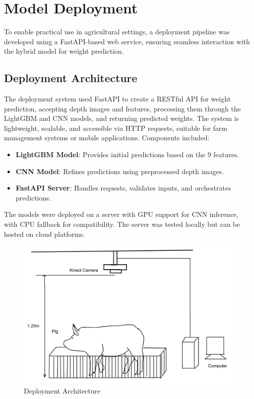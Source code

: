 {\section{Model Deployment} \label{Section 3.10}
To enable practical use in agricultural settings, a deployment pipeline was developed using a FastAPI-based web service, ensuring seamless interaction with the hybrid model for weight prediction.

\subsection{Deployment Architecture}

The deployment system used FastAPI to create a RESTful API for weight prediction, accepting depth images and features, processing them through the LightGBM and CNN models, and returning predicted weights. The system is lightweight, scalable, and accessible via HTTP requests, suitable for farm management systems or mobile applications. Components included:

\begin{itemize}
	\item \textbf{LightGBM Model}: Provides initial predictions based on the 9 features.
	\item \textbf{CNN Model}: Refines predictions using preprocessed depth images.
	\item \textbf{FastAPI Server}: Handles requests, validates inputs, and orchestrates predictions.
\end{itemize}

The models were deployed on a server with GPU support for CNN inference, with CPU fallback for compatibility. The server was tested locally but can be hosted on cloud platforms.

\begin{figure}[h]
	\centering
	\includegraphics[height=0.4\textheight]{figures/Untitled-1wqw}
	\caption{Deployment Architecture}
	\label{fig:Deployment Architecture}
\end{figure}

}
